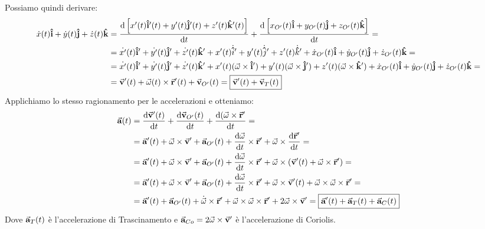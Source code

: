 \documentclass{article}
\renewcommand{\i}{\vu{i}}
\renewcommand{\j}{\vu{j}}
\renewcommand{\k}{\vu{k}}
\renewcommand{\a}{\va{a}}
\renewcommand{\v}{\va{v}}
\renewcommand{\r}{\va{r}}
\begin{document}
Possiamo quindi derivare:
\begin{equation}
\begin{split}
    \dot{x}(t)\i+\dot{y}(t)\j+\dot{z}(t)\k&=\dv{\left[x'(t)\i'(t)+y'(t)\j'(t)+z'(t)\k'(t)\right]}{t}+\dv{\left[x_{O'}(t)\i+y_{O'}(t)\j+z_{O'}(t)\k\right]}{t}=\\
    &=\dot{x'}(t)\i'+\dot{y'}(t)\j'+\dot{z'}(t)\k'+x'(t)\dot{\i}'+y'(t)\dot{\j}'+z'(t)\dot{\k}'+\dot{x}_{O'}(t)\i+\dot{y}_{O'}(t)\j+\dot{z}_{O'}(t)\k=\\
    &=\dot{x'}(t)\i'+\dot{y'}(t)\j'+\dot{z'}(t)\k'+x'(t)(\va{\omega}\times\i')+y'(t)(\va{\omega}\times\j')+z'(t)(\va{\omega}\times\k')+\dot{x}_{O'}(t)\i+\dot{y}_{O'}(t)\j+\dot{z}_{O'}(t)\k=\\
    &=\v'(t)+\va{\omega}(t)\times\r'(t)+\v_{O'}(t)=\boxed{\v'(t)+\v_T(t)}
\end{split}
\end{equation}
Applichiamo lo stesso ragionamento per le accelerazioni e otteniamo:
\begin{equation}
\begin{split}
    \a(t)&=\dv{\v'(t)}{t}+\dv{\v_{O'}(t)}{t}+\dv{(\va{\omega}\times\r'}{t}=\\  &=\a'(t)+\va{\omega}\times\v'+\a_{O'}(t)+\dv{\va{\omega}}{t}\times\r'+\va{\omega}\times\dv{\r'}{t}=\\
    &=\a'(t)+\va{\omega}\times\v'+\a_{O'}(t)+\dv{\va{\omega}}{t}\times\r'+\va{\omega}\times(\v'(t)+\va{\omega}\times\r')=\\
    &=\a'(t)+\va{\omega}\times\v'+\a_{O'}(t)+\dv{\va{\omega}}{t}\times\r'+\va{\omega}\times\v'(t)+\va{\omega}\times\va{\omega}\times\r'=\\
    &=\a'(t)+\a_{O'}(t)+\dot{\va{\omega}}\times\r'+\va{\omega}\times\va{\omega}\times\r'+2\va{\omega}\times\v'=\boxed{\a'(t)+\a_T(t)+\a_{C}(t)}\\
\end{split}
\end{equation}
Dove $\a_T(t)$ è l'accelerazione di Trascinamento e $\a_{Co}=2\va{\omega}\times\v'$ è l'accelerazione di Coriolis. 
\end{document}
